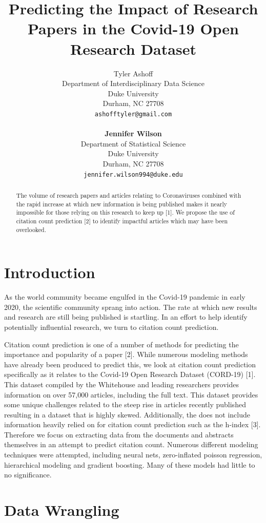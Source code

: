 \documentclass{article} %
\title{Predicting the Impact of Research Papers in the Covid-19 Open Research Dataset}
\author{
Tyler Ashoff \\
Department of Interdisciplinary Data Science\\
Duke University\\
Durham, NC 27708 \\
\texttt{ashofftyler@gmail.com} \\
\\
\textbf{Jennifer Wilson} \\
Department of Statistical Science\\
Duke University\\
Durham, NC 27708 \\
\texttt{jennifer.wilson994@duke.edu} \\
}
\begin{document}
\maketitle



\begin{abstract}
The volume of research papers and articles relating to Coronaviruses combined with the rapid increase at which new information is being published makes it nearly impossible for those relying on this research to keep up [1]. We propose the use of citation count prediction [2] to identify impactful articles which may have been overlooked.
\end{abstract}

\section{Introduction}

As the world community became engulfed in the Covid-19 pandemic in early 2020, the scientific community sprang into action. The rate at which new results and research are still being published is startling. In an effort to help identify potentially influential research, we turn to citation count prediction.

Citation count prediction is one of a number of methods for predicting the importance and popularity of a paper [2]. While numerous modeling methods have already been produced to predict this, we look at citation count prediction specifically as it relates to the Covid-19 Open Research Dataset (CORD-19) [1]. This dataset compiled by the Whitehouse and leading researchers provides information on over 57,000 articles, including the full text. This dataset provides some unique challenges related to the steep rise in articles recently published resulting in a dataset that is highly skewed. Additionally, the does not include information heavily relied on for citation count prediction such as the h-index [3]. Therefore we focus on extracting data from the documents and abstracts themselves in an attempt to predict citation count. Numerous different modeling techniques were attempted, including neural nets, zero-inflated poisson regression, hierarchical modeling and gradient boosting. Many of these models had little to no significance. 

\section{Data Wrangling}
\end{document}
